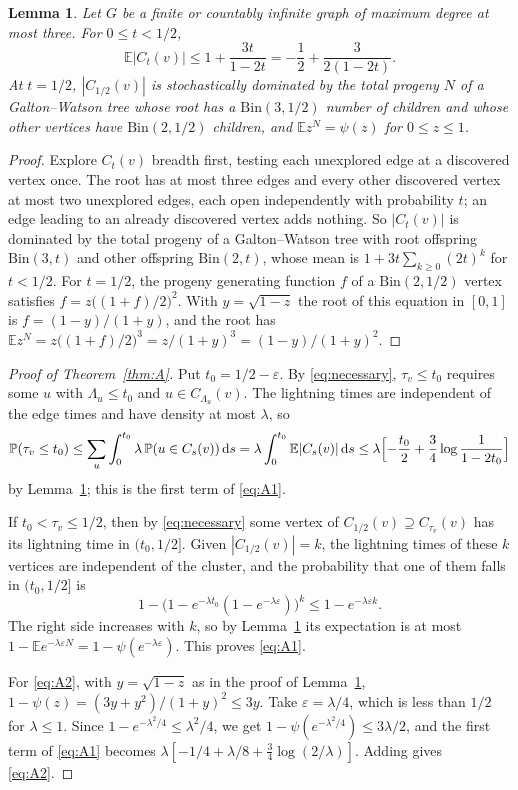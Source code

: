\documentclass[11pt]{amsart}
\newtheorem{lemma}[theorem]{Lemma}
\theoremstyle{remark}
\numberwithin{equation}{section}
\newcommand{\PP}{\mathbb{P}}
\newcommand{\E}{\mathbb{E}}
\newcommand{\dd}{\mathrm{d}}
\begin{document}
\begin{lemma}\label{lem:cluster}
Let $G$ be a finite or countably infinite graph of maximum degree at
most three. For $0\le t<1/2$,
\[
\E|C_t(v)|\le1+\frac{3t}{1-2t}=-\frac12+\frac{3}{2(1-2t)}.
\]
At $t=1/2$, $|C_{1/2}(v)|$ is stochastically dominated by the total
progeny $N$ of a Galton--Watson tree whose root has a
$\mathrm{Bin}(3,1/2)$ number of children and whose other vertices have
$\mathrm{Bin}(2,1/2)$ children, and $\E z^N=\psi(z)$ for
$0\le z\le1$.
\end{lemma}

\begin{proof}
Explore $C_t(v)$ breadth first, testing each unexplored edge at a
discovered vertex once. The root has at most three edges and every other
discovered vertex at most two unexplored edges, each open independently
with probability $t$; an edge leading to an already discovered vertex adds
nothing. So $|C_t(v)|$ is dominated by the total progeny of a
Galton--Watson tree with root offspring $\mathrm{Bin}(3,t)$ and other
offspring $\mathrm{Bin}(2,t)$, whose mean is $1+3t\sum_{k\ge0}(2t)^k$ for
$t<1/2$. For $t=1/2$, the progeny generating function $f$ of a
$\mathrm{Bin}(2,1/2)$ vertex satisfies $f=z\bigl((1+f)/2\bigr)^2$. With
$y=\sqrt{1-z}$ the root of this equation in $[0,1]$ is
$f=(1-y)/(1+y)$, and the root has
$\E z^N=z\bigl((1+f)/2\bigr)^3=z/(1+y)^3=(1-y)/(1+y)^2$.
\end{proof}

\begin{proof}[Proof of Theorem~\ref{thm:A}]
Put $t_0=1/2-\varepsilon$. By \eqref{eq:necessary}, $\tau_v\le t_0$
requires some $u$ with $\Lambda_u\le t_0$ and $u\in C_{\Lambda_u}(v)$. The
lightning times are independent of the edge times and have density at
most $\lambda$, so
\[
\PP(\tau_v\le t_0)\le\sum_u\int_0^{t_0}\lambda\,\PP(u\in C_s(v))\,\dd s
=\lambda\int_0^{t_0}\E|C_s(v)|\,\dd s
\le\lambda\Bigl[-\frac{t_0}2+\frac34\log\frac1{1-2t_0}\Bigr]
\]
by Lemma~\ref{lem:cluster}; this is the first term of \eqref{eq:A1}.

If $t_0<\tau_v\le1/2$, then by \eqref{eq:necessary} some vertex of
$C_{1/2}(v)\supseteq C_{\tau_v}(v)$ has its lightning time in
$(t_0,1/2]$. Given $|C_{1/2}(v)|=k$, the lightning times of these $k$
vertices are independent of the cluster, and the probability that one of
them falls in $(t_0,1/2]$ is
\[
1-\bigl(1-e^{-\lambda t_0}(1-e^{-\lambda\varepsilon})\bigr)^k
\le1-e^{-\lambda\varepsilon k}.
\]
The right side increases with $k$, so by Lemma~\ref{lem:cluster} its
expectation is at most $1-\E e^{-\lambda\varepsilon N}
=1-\psi(e^{-\lambda\varepsilon})$. This proves \eqref{eq:A1}.

For \eqref{eq:A2}, with $y=\sqrt{1-z}$ as in the proof of Lemma~\ref{lem:cluster},
$1-\psi(z)=(3y+y^2)/(1+y)^2\le3y$. Take $\varepsilon=\lambda/4$,
which is less than $1/2$ for $\lambda\le1$. Since
$1-e^{-\lambda^2/4}\le\lambda^2/4$, we get
$1-\psi(e^{-\lambda^2/4})\le3\lambda/2$, and the first term of
\eqref{eq:A1} becomes $\lambda[-1/4+\lambda/8+\frac34\log(2/\lambda)]$.
Adding gives \eqref{eq:A2}.
\end{proof}
\end{document}
